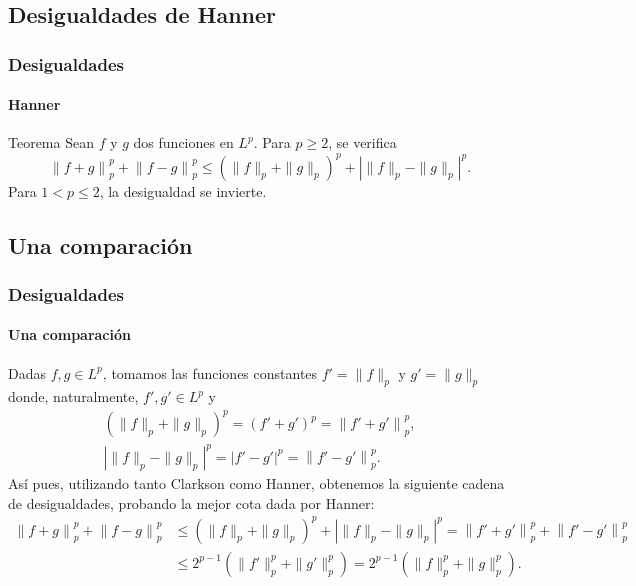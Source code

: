 \documentclass[aspectratio=169]{beamer}
\begin{document}
\subsection{Desigualdades de Hanner}

\begin{frame}
  \frametitle{Desigualdades}
  \framesubtitle{Hanner}
  \begin{block}{Teorema}
    Sean $ f $ y $ g $ dos funciones en $L^p$. Para $ p \geq 2 $, se verifica
    \begin{equation} \label{eq:hanner}
        \left\| f+g \right\|_p^p + \left\| f-g \right\|_p^p \leq \left( \|f \|_p + \|g\|_p \right)^p + \left| \|f \|_p - \|g\|_p \right|^p.
    \end{equation}
    Para $ 1 < p \leq 2 $, la desigualdad se invierte.
  \end{block}
\end{frame}

\subsection{Una comparación}

\begin{frame}
  \frametitle{Desigualdades}
  \framesubtitle{Una comparación}
  Dadas $f, g \in L^p $, tomamos las funciones constantes $ f' = \|f \|_p $ y $ g' = \|g\|_p $ donde, naturalmente, $ f', g' \in L^p $ y
  \begin{align}
      \left( \|f \|_p + \|g\|_p \right)^p = \left( f' + g' \right)^p = \left\| f'+g' \right\|_p^p, \\
      \left| \|f \|_p - \|g\|_p \right|^p = \left| f' - g' \right|^p = \left\| f'-g' \right\|_p^p.
  \end{align}
  Así pues, utilizando tanto Clarkson como Hanner, obtenemos la siguiente cadena de desigualdades, probando la mejor cota dada por Hanner:
  \begin{align}
      \left\| f+g \right\|_p^p + \left\| f-g \right\|_p^p &\leq  \left( \|f \|_p + \|g\|_p \right)^p + \left| \|f \|_p - \|g\|_p \right|^p = \left\| f'+g' \right\|_p^p + \left\| f'-g' \right\|_p^p \\
      &\leq 2^{p-1} \left( \|f'\|_p^p + \|g'\|_p^p \right) = 2^{p-1} \left( \|f\|_p^p + \|g\|_p^p \right).
  \end{align}
\end{frame}
\end{document}
